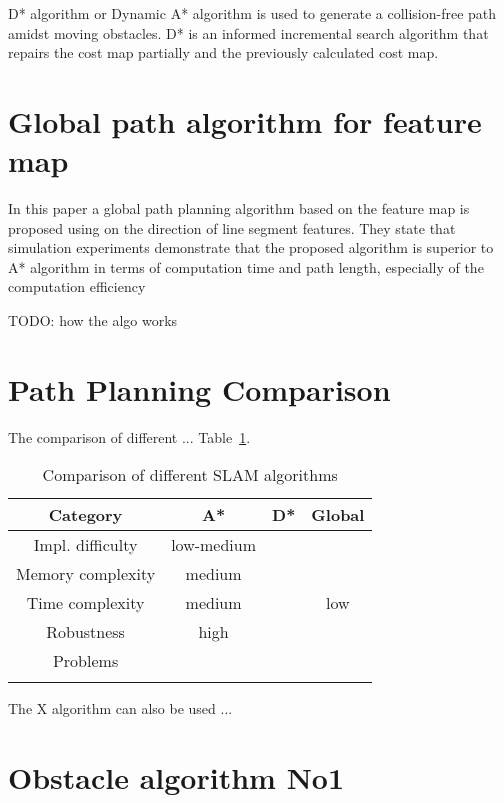 \documentclass[12pt, a4paper, onecolumn]{article}
\begin{document}
D* algorithm or Dynamic A* algorithm is used to generate a collision-free path amidst moving obstacles.
D* is an informed incremental search algorithm that repairs the cost map partially and the previously calculated cost map. \cite{Karur21}

\section{Global path algorithm for feature map}

In this \cite{Ren22} paper a global path planning algorithm based on the feature map is proposed using on the direction of line segment features. They state that simulation experiments demonstrate
that the proposed algorithm is superior to A* algorithm in terms of computation time
and path length, especially of the computation efficiency \cite{Ren22}

TODO: how the algo works

\section{Path Planning Comparison}
The comparison of different ...
Table~\ref{tab:path_algorithms}.
\begin{table}[h!]
  \begin{center}
    \begin{tabular}[c]{|c || c c c |}
      \hline
       Category        &  A*            & D*            & Global     \\
      \hline
      Impl. difficulty & low-medium     &  &      \\
      \hline
      Memory complexity & medium         &           &      \\
      \hline
      Time complexity  & medium         &         & low     \\
      \hline
      Robustness       & high          &         &      \\
      \hline
      Problems         &  &  & \\
                       &  &  & \\
      \hline
    \end{tabular}
  \end{center}
  \caption{Comparison of different SLAM algorithms}
  \label{tab:path_algorithms}
\end{table}
The X algorithm can also be used ...

\section{Obstacle algorithm No1}
\end{document}
